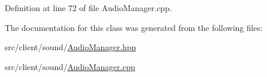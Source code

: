Definition at line 72 of file Audio\+Manager.\+cpp.



The documentation for this class was generated from the following files\+:\begin{DoxyCompactItemize}
\item 
src/client/sound/\mbox{\hyperlink{_audio_manager_8hpp}{Audio\+Manager.\+hpp}}\item 
src/client/sound/\mbox{\hyperlink{_audio_manager_8cpp}{Audio\+Manager.\+cpp}}\end{DoxyCompactItemize}

